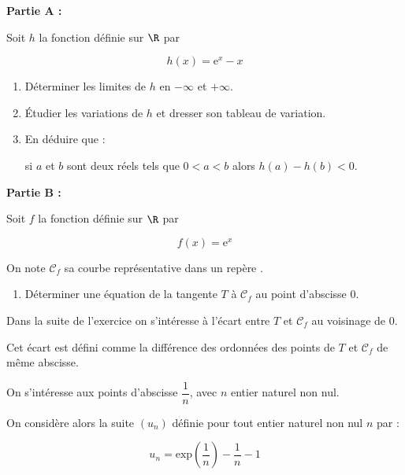 \bigskip

\textbf{Partie A :}

\medskip

Soit $h$ la fonction définie sur $\R$ par

\[h(x) = \text{e}^x - x\]

\smallskip

\begin{enumerate}
\item Déterminer les limites de $h$ en $-\infty$ et $+\infty$.
\item Étudier les variations de $h$ et dresser son tableau de variation. 
\item En déduire que :

si $a$ et $b$ sont deux réels tels que $0 < a < b$ alors $h(a) - h(b) < 0$.
\end{enumerate}

\bigskip

\textbf{Partie B :}

\medskip

Soit $f$ la fonction définie sur $\R$ par

\[f(x) = \text{e}^x\]

On note $\mathcal{C}_f$ sa courbe représentative dans un repère \Oij.

\medskip

\begin{enumerate}
\item Déterminer une équation de la tangente $T$ à $\mathcal{C}_f$ au point d'abscisse 0.
\end{enumerate}

Dans la suite de l'exercice on s'intéresse à l'écart entre $T$ et $\mathcal{C}_f$ au voisinage de $0$.

Cet écart est défini comme la différence des ordonnées des points de $T$ et $\mathcal{C}_f$ de même abscisse.

On s'intéresse aux points d'abscisse $\dfrac{1}{n}$, avec $n$ entier naturel non nul.

On considère alors la suite $\left(u_n\right)$ définie pour tout entier naturel non nul $n$ par :

\[u_n = \text{exp} \left(\dfrac{1}{n}\right) - \dfrac{1}{n} - 1\]


